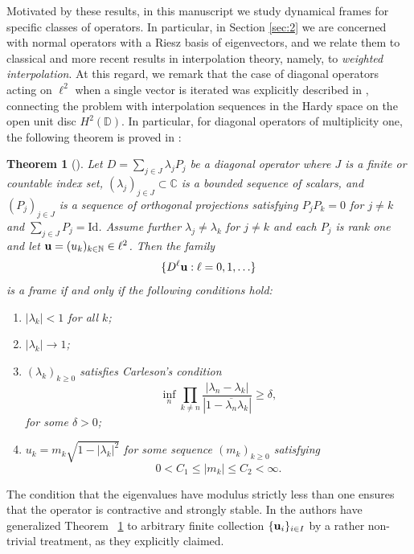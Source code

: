\documentclass[11pt]{amsart}
\newtheorem{thm}{Theorem}[section]
\theoremstyle{definition}
\theoremstyle{remark}
\numberwithin{equation}{section}
\def\DD{{\mathbb D}}
\newcommand{\uu}{\textnormal{\textbf{u}} }
\begin{document}
\smallskip

Motivated by these results, in this manuscript we study dynamical frames for specific classes of operators. In particular, in Section \ref{sec:2} we are concerned with normal operators with a Riesz basis of eigenvectors, and we relate them to classical and more recent results in interpolation theory, namely, to \emph{weighted interpolation}. At this regard, we remark that the case of diagonal operators acting on $\ell^2$ when a single vector is iterated was explicitly described in \cite{CMPP20}, connecting the problem with interpolation sequences in the Hardy space on the open unit disc $H^2(\DD)$. In particular, for diagonal operators of multiplicity one, the following theorem is proved in \cite{ACMT17}:

\smallskip

\begin{thm}[\cite{ACMT17}]\label{thm:diagonal}
Let $D = \sum_{j\in J} \lambda_j P_j$ be a diagonal operator where $J$ is a finite or countable index set, $(\lambda_j)_{j\in J}\subset \mathbb{C}$ is a
bounded sequence of scalars, and $(P_j)_{j\in J}$ is a sequence of orthogonal
projections satisfying $P_j P_k = 0$ for $j \neq k$ and $\sum_{j\in J} P_j = \mathrm{Id}$. Assume further $\lambda_j \neq \lambda_k$ for $j \neq k$ and
each $P_j$ is rank one and let $\uu =(u_k)_{k\in\mathbb{N}} \in \ell^2$. Then the family
\[
\{D^{\ell} \uu : \ell = 0,1,\ldots\}
\]
is a frame if and only if the following conditions hold:
\begin{enumerate}
\item $|\lambda_k| < 1$ for all $k$;
\item $|\lambda_k| \to 1$;
\item $(\lambda_k)_{k\geq 0}$ satisfies Carleson’s condition
\[
\inf_n \prod_{k \neq n}
\frac{|\lambda_n - \lambda_k|}{|1 - \overline{\lambda_n}\lambda_k|}
\ge \delta,
\]
for some $\delta > 0$;
\item $u_k= m_k \sqrt{1 - |\lambda_k|^2}$ for some sequence $(m_k)_{k\geq 0}$ satisfying
\[
0 < C_1 \le |m_k| \le C_2 < \infty.
\]
\end{enumerate}
\end{thm}

The condition that the eigenvalues have modulus strictly less than one ensures that the operator is contractive and strongly stable. In \cite[Theorem~2.3]{CMPP20} the authors have generalized Theorem~ \ref{thm:diagonal} to arbitrary finite collection $\{\uu_i\}_{i\in I}$ by a rather non-trivial treatment, as they explicitly claimed.
\end{document}
